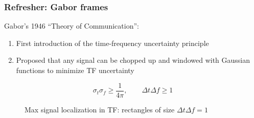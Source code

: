 \documentclass{beamer}
\begin{document}
\begin{frame}
	\frametitle{Refresher: Gabor frames}
	Gabor's 1946 ``Theory of Communication'':
	\begin{enumerate}
		\item
			First introduction of the time-frequency uncertainty principle
		\item
			Proposed that any signal can be chopped up and windowed with Gaussian functions to minimize TF uncertainty
	\end{enumerate}
	    \[ \sigma_{t}\sigma_{f} \ge \frac{1}{4\pi},\qquad\Delta t\Delta f \ge 1 \]
	\begin{figure}
		\vspace{-1.5em}
		\centering
		\hspace{0.35em}
		\caption{Max signal localization in TF: rectangles of size $\Delta t\Delta f = 1$}
	\end{figure}
\end{frame}

\end{document}
